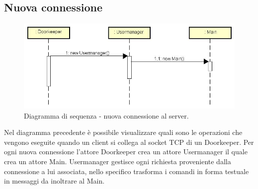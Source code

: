 \documentclass[a4paper]{article}
\begin{document}
       \subsection{Nuova connessione}
            \begin{figure} [H]
				\centering
				\includegraphics[width=\textwidth]{Sequenza/seqNuovaConnessione.jpg}
				\caption{Diagramma di sequenza - nuova connessione al server.}
			\end{figure}
            Nel diagramma precedente è possibile visualizzare quali sono le operazioni che vengono eseguite quando un client si collega al socket TCP di un Doorkeeper. Per ogni nuova connessione l'attore Doorkeeper crea un attore Usermanager il quale crea un attore Main. Usermanager gestisce ogni richiesta proveniente dalla connessione a lui associata, nello specifico trasforma i comandi in forma testuale in messaggi da inoltrare al Main.
        
\end{document}
